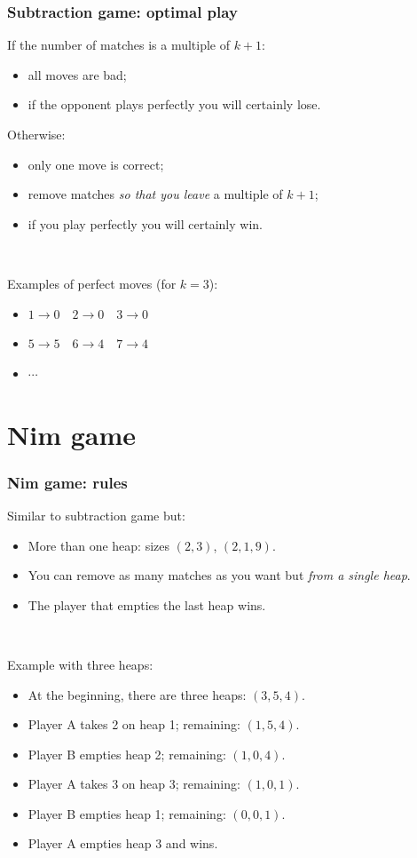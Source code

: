 \documentclass[12pt]{beamer}
\begin{document}
\begin{frame}
\frametitle{Subtraction game: optimal play}
If the number of matches is a multiple of $k+1$:
\begin{itemize}
    \item all moves are bad;
    \item if the opponent plays perfectly you will certainly lose.
\end{itemize}

Otherwise:
\begin{itemize}
    \item only one move is correct;
    \item remove matches \emph{so that you leave} a multiple of $k+1$;
    \item if you play perfectly you will certainly win.
\end{itemize}

~

Examples of perfect moves (for $k=3$):
\begin{itemize}
\item $1 \rightarrow 0 \quad 2 \rightarrow 0 \quad 3 \rightarrow 0$
\item $5 \rightarrow 5 \quad 6 \rightarrow 4 \quad 7 \rightarrow 4$
\item $\cdots$
\end{itemize}
\end{frame}


\section{Nim game}

\begin{frame}
\frametitle{Nim game: rules}
Similar to subtraction game but:
\begin{itemize}
\item More than one heap: sizes $(2,3)$, $(2,1,9)$.
\item You can remove as many matches as you want but \emph{from a single heap}.
\item The player that empties the last heap wins.
\end{itemize}

~

Example with three heaps:
\begin{itemize}
\item At the beginning, there are three heaps: $(3,5,4)$.
\item Player A takes 2 on heap 1; remaining: $(1,5,4)$.
\item Player B empties heap 2; remaining: $(1,0,4)$.
\item Player A takes 3 on heap 3; remaining: $(1,0,1)$.
\item Player B empties heap 1; remaining: $(0,0,1)$.
\item Player A empties heap 3 and wins.
\end{itemize}
\end{frame}
\end{document}

